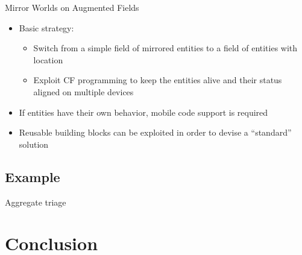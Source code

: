 \documentclass[presentation]{beamer} %
\begin{document}
\begin{frame}{Mirror Worlds on Augmented Fields}
  \begin{block}{}
    \begin{itemize}
      \item Basic strategy: 
      \begin{itemize}
        \item Switch from a simple field of mirrored entities to a field of entities with location
        \item Exploit CF programming to keep the entities alive and their status aligned on multiple devices
      \end{itemize}
      \item If entities have their own behavior, mobile code support is required \cite{computationalfields-forte2015}
      \item Reusable building blocks can be exploited in order to devise a ``standard'' solution \cite{IoT2015}
    \end{itemize}
  \end{block}
\end{frame}

\subsection{Example}
\begin{frame}{Aggregate triage}
  \begin{center}
  \end{center}
\end{frame}

\section{Conclusion}
\end{document}
